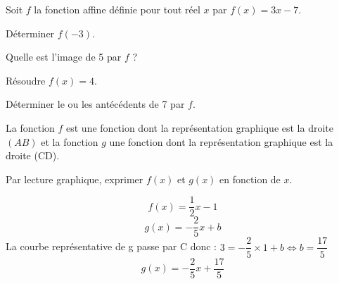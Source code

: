 \documentclass[11pt,a4paper]{article}  %
\begin{document}
	\graphicspath{{images/}}
	
	\begin{center}
		
		
	\end{center}




Soit $f$ la fonction affine définie pour tout réel $x$ par $f(x)=3 x-7$.
\begin{enumMet}
	\item Déterminer $f(-3)$. 
	\item Quelle est l'image de 5 par $f$ ? 
	\item Résoudre $f(x)=4$. 
	\item {} Déterminer le ou les antécédents de 7 par $f$. 
\end{enumMet}

La fonction $f$ est une fonction dont la représentation graphique est la droite $(A B)$ et la fonction $g$ une fonction dont la représentation graphique est la droite (CD). 

 Par lecture graphique, exprimer $f(x)$ et $g(x)$ en fonction de $x$.

\begin{corrBox}
$$f(x)=\dfrac{1}{2}x-1$$
$$g(x)=-\dfrac{2}{5}x+b$$
La courbe représentative de g passe par C donc : $3=-\dfrac{2}{5}\times 1+b \iff b=\dfrac{17}{5}$
$$g(x)=-\dfrac{2}{5}x+\dfrac{17}{5}$$
	
\end{corrBox}
\end{document}

